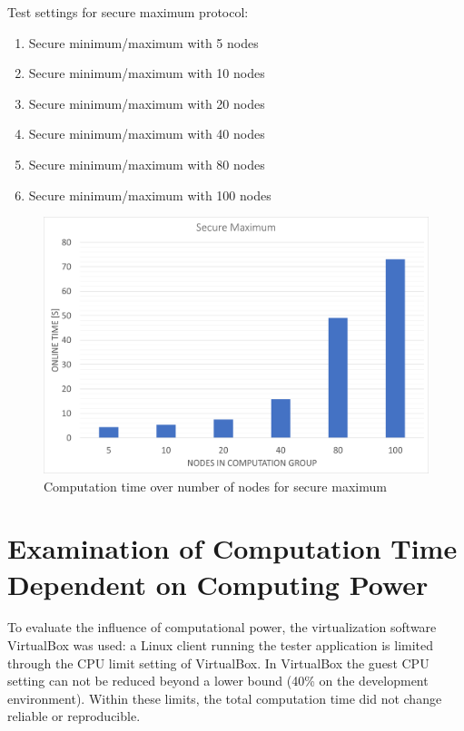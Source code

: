 Test settings for secure maximum protocol:
\begin{enumerate}
	\item Secure minimum/maximum with 5 nodes
	\item Secure minimum/maximum with 10 nodes
	\item Secure minimum/maximum with 20 nodes
	\item Secure minimum/maximum with 40 nodes
	\item Secure minimum/maximum with 80 nodes
	\item Secure minimum/maximum with 100 nodes
\end{enumerate}


\begin{figure}[!htbp] %
	\caption{Computation time over number of nodes for secure maximum} \label{figure:Computation time over number of nodes for secure maximum}
	\includegraphics[scale=1.0]{figures/eval_max.png}
\end{figure}

\section{Examination of Computation Time Dependent on Computing Power} \label{Examination of Computation Time Dependent on Computing Power}
%
To evaluate the influence of computational power, the virtualization software VirtualBox was used: a Linux client running the tester application is limited through the CPU limit setting of VirtualBox. In VirtualBox the guest CPU setting can not be reduced beyond a lower bound (40\% on the development environment). Within these limits, the total computation time did not change reliable or reproducible.

